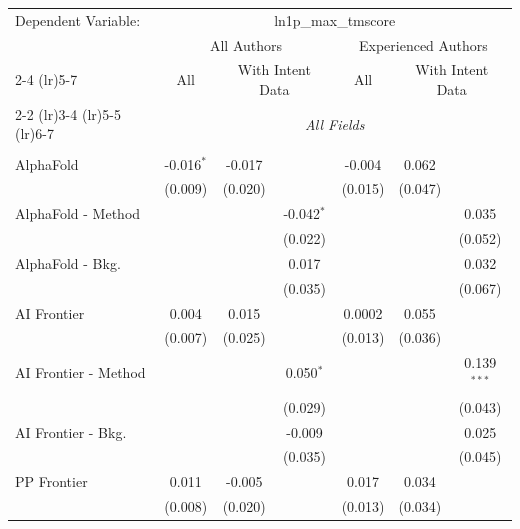 \begingroup
\centering
\begin{tabular}{lcccccc}
   \tabularnewline \midrule \midrule
   Dependent Variable: & \multicolumn{6}{c}{ln1p\_max\_tmscore}\\
 & \multicolumn{3}{c}{All Authors} & \multicolumn{3}{c}{Experienced Authors} \\
\cmidrule(lr){2-4} \cmidrule(lr){5-7}
 & \multicolumn{1}{c}{All} & \multicolumn{2}{c}{With Intent Data} & \multicolumn{1}{c}{All} & \multicolumn{2}{c}{With Intent Data} \\
\cmidrule(lr){2-2} \cmidrule(lr){3-4} \cmidrule(lr){5-5} \cmidrule(lr){6-7}
 & \multicolumn{6}{c}{\textit{All Fields}} \\ \\
   AlphaFold            & -0.016$^{*}$ & -0.017  &              & -0.004  & 0.062   &   \\   
                        & (0.009)      & (0.020) &              & (0.015) & (0.047) &   \\   
   AlphaFold - Method   &              &         & -0.042$^{*}$ &         &         & 0.035\\   
                        &              &         & (0.022)      &         &         & (0.052)\\   
   AlphaFold - Bkg.     &              &         & 0.017        &         &         & 0.032\\   
                        &              &         & (0.035)      &         &         & (0.067)\\   
   AI Frontier          & 0.004        & 0.015   &              & 0.0002  & 0.055   &   \\   
                        & (0.007)      & (0.025) &              & (0.013) & (0.036) &   \\   
   AI Frontier - Method &              &         & 0.050$^{*}$  &         &         & 0.139$^{***}$\\   
                        &              &         & (0.029)      &         &         & (0.043)\\   
   AI Frontier - Bkg.   &              &         & -0.009       &         &         & 0.025\\   
                        &              &         & (0.035)      &         &         & (0.045)\\   
   PP Frontier          & 0.011        & -0.005  &              & 0.017   & 0.034   &   \\   
                        & (0.008)      & (0.020) &              & (0.013) & (0.034) &   \\   

\end{tabular}
